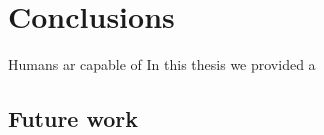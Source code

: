 \chapter{Conclusions}
\label{chap:conclusions}

Humans ar capable of 
In this thesis we provided a 
\section{Future work}
